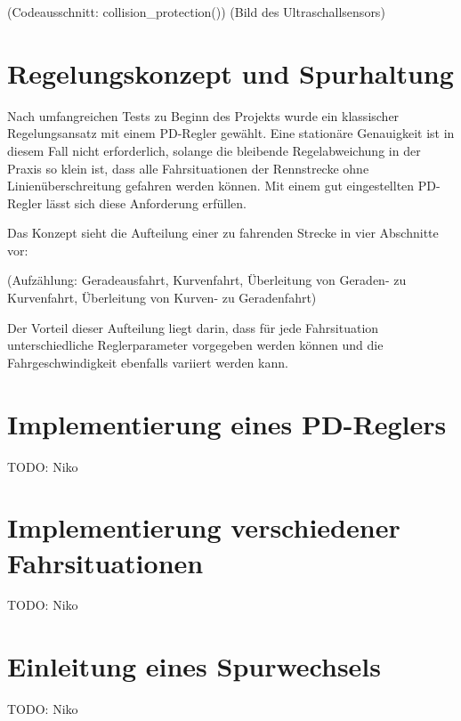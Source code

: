 (Codeausschnitt: collision_protection())
(Bild des Ultraschallsensors)

\section{Regelungskonzept und Spurhaltung}
\label{sec:wallfollower}

Nach umfangreichen Tests zu Beginn des Projekts wurde ein klassischer Regelungsansatz mit einem PD-Regler gewählt. Eine stationäre Genauigkeit ist in diesem Fall nicht erforderlich, solange die bleibende Regelabweichung in der Praxis so klein ist, dass alle Fahrsituationen der Rennstrecke ohne Linienüberschreitung gefahren werden können. Mit einem gut eingestellten PD-Regler lässt sich diese Anforderung erfüllen.

Das Konzept sieht die Aufteilung einer zu fahrenden Strecke in vier Abschnitte vor:

(Aufzählung: Geradeausfahrt, Kurvenfahrt, Überleitung von Geraden- zu Kurvenfahrt, Überleitung von Kurven- zu Geradenfahrt)

Der Vorteil dieser Aufteilung liegt darin, dass für jede Fahrsituation unterschiedliche Reglerparameter vorgegeben werden können und die Fahrgeschwindigkeit ebenfalls variiert werden kann. 

\section{Implementierung eines PD-Reglers}
\label{sec:pdregler}

TODO: Niko

\section{Implementierung verschiedener Fahrsituationen}
\label{sec:fahrsituationen}

TODO: Niko

\section{Einleitung eines Spurwechsels}
\label{sec:spurwechsel}

TODO: Niko